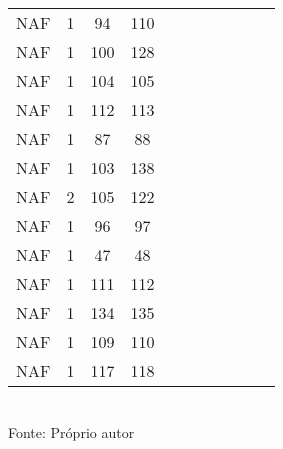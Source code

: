 \begin{table}[H]
{\begin{tabular}{ccccccccccc}
NAF & 1 & 94 & 110 &  &  &  &  &  &  &  \\
NAF & 1 & 100 & 128 &  &  &  &  &  &  &  \\
NAF & 1 & 104 & 105 &  &  &  &  &  &  &  \\
NAF & 1 & 112 & 113 &  &  &  &  &  &  &  \\
NAF & 1 & 87 & 88 &  &  &  &  &  &  &  \\
NAF & 1 & 103 & 138 &  &  &  &  &  &  &  \\
NAF & 2 & 105 & 122 &  &  &  &  &  &  &  \\
NAF & 1 & 96 & 97 &  &  &  &  &  &  &  \\
NAF & 1 & 47 & 48 &  &  &  &  &  &  &  \\
NAF & 1 & 111 & 112 &  &  &  &  &  &  &  \\
NAF & 1 & 134 & 135 &  &  &  &  &  &  &  \\
NAF & 1 & 109 & 110 &  &  &  &  &  &  &  \\
NAF & 1 & 117 & 118 &  &  &  &  &  &  &  \\
\bottomrule
\end{tabular}}
\\Fonte: Próprio autor
\end{table}


